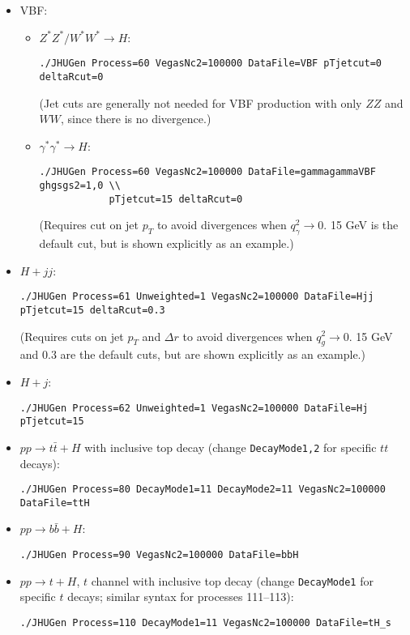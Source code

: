 \documentclass[aps,superscriptaddress,nofootinbib]{revtex4}
\begin{document}
\begin{itemize}
\item VBF:
\begin{itemize}
\item $Z^*Z^*/W^*W^*\to H$:
\begin{verbatim}
./JHUGen Process=60 VegasNc2=100000 DataFile=VBF pTjetcut=0 deltaRcut=0
\end{verbatim}
(Jet cuts are generally not needed for VBF production with only $ZZ$ and $WW$, since there is no divergence.)
\item $\gamma^*\gamma^*\to H$:
\begin{verbatim}
./JHUGen Process=60 VegasNc2=100000 DataFile=gammagammaVBF ghgsgs2=1,0 \\
			pTjetcut=15 deltaRcut=0
\end{verbatim}
(Requires cut on jet $p_T$ to avoid divergences when $q_\gamma^2\to 0$.  15 GeV is the default cut, but is shown explicitly as an example.)
\end{itemize}
\item $H+jj$:
\begin{verbatim}
./JHUGen Process=61 Unweighted=1 VegasNc2=100000 DataFile=Hjj pTjetcut=15 deltaRcut=0.3
\end{verbatim}
(Requires cuts on jet $p_T$ and $\Delta r$ to avoid divergences when $q_g^2\to 0$.  15 GeV and 0.3 are the default cuts, but are shown explicitly as an example.)
\item $H+j$:
\begin{verbatim}
./JHUGen Process=62 Unweighted=1 VegasNc2=100000 DataFile=Hj pTjetcut=15
\end{verbatim}
\item $pp \to t\bar{t}+H$ with inclusive top decay (change \verb|DecayMode1,2| for specific $tt$ decays):
\begin{verbatim}
./JHUGen Process=80 DecayMode1=11 DecayMode2=11 VegasNc2=100000 DataFile=ttH
\end{verbatim}
\item $pp \to b\bar{b}+H$:
\begin{verbatim}
./JHUGen Process=90 VegasNc2=100000 DataFile=bbH
\end{verbatim}
\item $pp \to t+H$, $t$ channel with inclusive top decay (change \verb|DecayMode1| for specific $t$ decays; similar syntax for processes 111--113):
\begin{verbatim}
./JHUGen Process=110 DecayMode1=11 VegasNc2=100000 DataFile=tH_s
\end{verbatim}
\end{itemize}
\end{document}
